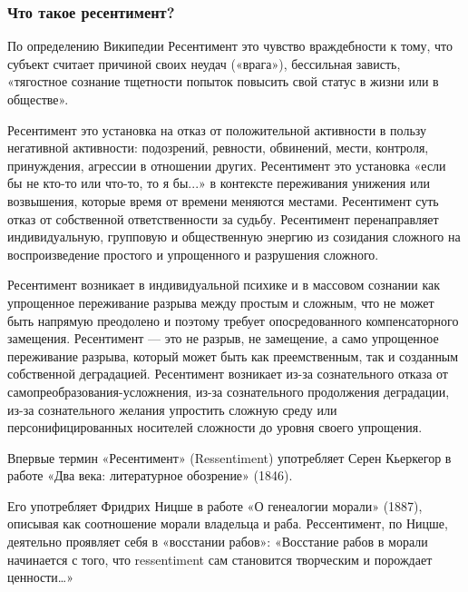  
 
 
 
 

\subsubsection{Что такое ресентимент?}
\label{sec:11_02_2022.stz.news.ua.hvylya.1.vse_zlo_ot_ressentimenta.1.chto_takoe_ressentiment}

По определению Википедии Ресентимент это чувство враждебности к тому, что
субъект считает причиной своих неудач («врага»), бессильная зависть, «тягостное
сознание тщетности попыток повысить свой статус в жизни или в обществе».

Ресентимент это установка на отказ от положительной активности в пользу
негативной активности: подозрений, ревности, обвинений, мести, контроля,
принуждения, агрессии в отношении других. Ресентимент это установка «если бы не
кто-то или что-то, то я бы...» в контексте переживания унижения или возвышения,
которые время от времени меняются местами. Ресентимент суть отказ от
собственной ответственности за судьбу. Ресентимент перенаправляет
индивидуальную, групповую и общественную энергию из созидания сложного на
воспроизведение простого и упрощенного и разрушения сложного.

Ресентимент возникает в индивидуальной психике и в массовом сознании как
упрощенное переживание разрыва между простым и сложным, что не может быть
напрямую преодолено и поэтому требует опосредованного компенсаторного
замещения. Ресентимент — это не разрыв, не замещение, а само упрощенное
переживание разрыва, который может быть как преемственным, так и созданным
собственной деградацией. Ресентимент возникает из-за сознательного отказа от
самопреобразования-усложнения, из-за сознательного продолжения деградации,
из-за сознательного желания упростить сложную среду или персонифицированных
носителей сложности до уровня своего упрощения.

Впервые термин «Ресентимент» (Ressentiment) употребляет Серен Кьеркегор в
работе «Два века: литературное обозрение» (1846).

Его употребляет Фридрих Ницше в работе «О генеалогии морали» (1887), описывая
как соотношение морали владельца и раба. Рессентимент, по Ницше, деятельно
проявляет себя в «восстании рабов»: «Восстание рабов в морали начинается с
того, что ressentiment сам становится творческим и порождает ценности…»

